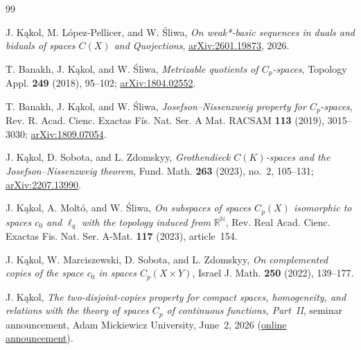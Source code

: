\documentclass[11pt]{article}
\begin{document}
\begin{thebibliography}{99}

J. K\k{a}kol, M. L\'opez-Pellicer, and W. \'Sliwa,
\emph{On weak*-basic sequences in duals and biduals of spaces $C(X)$ and
Quojections}, \href{https://arxiv.org/abs/2601.19873}{arXiv:2601.19873}, 2026.

T. Banakh, J. K\k{a}kol, and W. \'Sliwa,
\emph{Metrizable quotients of $C_p$-spaces},
Topology Appl. \textbf{249} (2018), 95--102;
\href{https://arxiv.org/abs/1804.02552}{arXiv:1804.02552}.

T. Banakh, J. K\k{a}kol, and W. \'Sliwa,
\emph{Josefson--Nissenzweig property for $C_p$-spaces},
Rev. R. Acad. Cienc. Exactas F\'is. Nat. Ser. A Mat. RACSAM
\textbf{113} (2019), 3015--3030;
\href{https://arxiv.org/abs/1809.07054}{arXiv:1809.07054}.

J. K\k{a}kol, D. Sobota, and L. Zdomskyy,
\emph{Grothendieck $C(K)$-spaces and the Josefson--Nissenzweig theorem},
Fund. Math. \textbf{263} (2023), no.~2, 105--131;
\href{https://arxiv.org/abs/2207.13990}{arXiv:2207.13990}.

J. K\k{a}kol, A. Molt\'o, and W. \'Sliwa,
\emph{On subspaces of spaces $C_p(X)$ isomorphic to spaces $c_0$ and
$\ell_q$ with the topology induced from $\mathbb{R}^{\mathbb{N}}$},
Rev. Real Acad. Cienc. Exactas Fis. Nat. Ser. A-Mat.
\textbf{117} (2023), article~154.

J. K\k{a}kol, W. Marciszewski, D. Sobota, and L. Zdomskyy,
\emph{On complemented copies of the space $c_0$ in spaces $C_p(X\times Y)$},
Israel J. Math. \textbf{250} (2022), 139--177.

J. K\k{a}kol,
\emph{The two-disjoint-copies property for compact spaces, homogeneity, and
relations with the theory of spaces $C_p$ of continuous functions, Part~II},
seminar announcement, Adam Mickiewicz University, June~2, 2026
(\href{https://wmi.amu.edu.pl/zycie-naukowe/wyklady-i-seminaria/seminarium-zakladow-analizy-funkcjonalnej-oraz-analizy-matematycznej/wlasnosc-dwoch-rozlacznych-kopii-dla-przestrzeni-zwartych\%2C-jednorodnosc-i-relacje-z-teoria-przestrzeni-c_p-funkcji-ciaglych-czesc-ii}{online announcement}).

\end{thebibliography}
\end{document}
